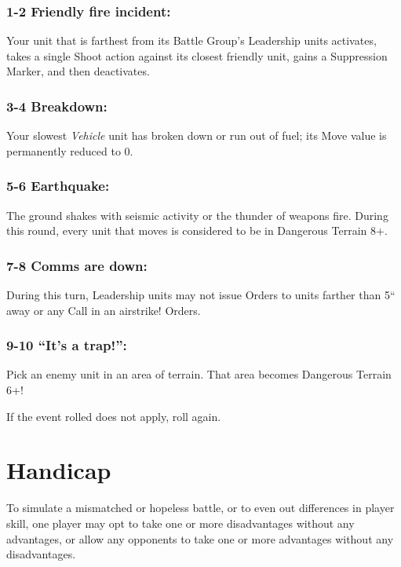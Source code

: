 \begin{multicols}{2}
\subsubsection*{1-2 Friendly fire incident:} Your unit that is farthest from its Battle Group's Leadership units activates, takes a single Shoot action against its closest friendly unit, gains a Suppression Marker, and then deactivates.

\subsubsection*{3-4 Breakdown:} Your slowest \textit{Vehicle} unit has broken down or run out of fuel; its Move value is permanently reduced to 0.

\subsubsection*{5-6 Earthquake:} The ground shakes with seismic activity or the thunder of weapons fire. During this round, every unit that moves is considered to be in Dangerous Terrain 8+.

\subsubsection*{7-8 Comms are down:} During this turn, Leadership units may not issue Orders to units farther than 5`` away or any Call in an airstrike! Orders.

\subsubsection*{9-10 ``It's a trap!'':} Pick an enemy unit in an area of terrain. That area becomes Dangerous Terrain 6+!

If the event rolled does not apply, roll again.




\section*{Handicap}
To simulate a mismatched or hopeless battle, or to even out differences in player skill, one player may opt to take one or more disadvantages without any advantages,  or allow any opponents to take one or more advantages without any disadvantages.

\end{multicols}

